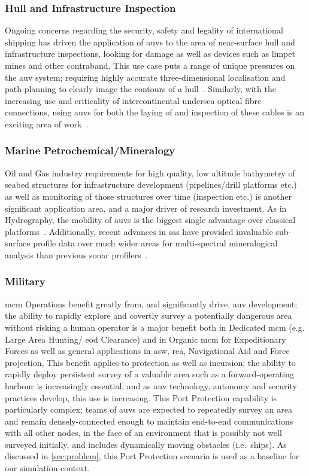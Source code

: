 \subsubsection{Hull and Infrastructure Inspection}
Ongoing concerns regarding the security, safety and legality of international shipping has driven the application of \glspl{auv} to the area of near-surface hull and infrastructure inspections, looking for damage as well as devices such as limpet mines and other contraband.
This use case puts a range of unique pressures on the \gls{auv} system; requiring highly accurate three-dimensional localisation and path-planning to clearly image the contours of a hull~\cite{Nicholson2008}.
Similarly, with the increasing use and criticality of intercontinental undersea optical fibre connections, using \glspl{auv} for both the laying of and inspection of these cables is an exciting area of work~\cite{Yu2004,Asakawa2002}.

\subsubsection{Marine Petrochemical/Mineralogy}
Oil and Gas industry requirements for high quality, low altitude bathymetry of seabed structures for infrastructure development (pipelines/drill platforms etc.) as well as monitoring of those structures over time (inspection etc.) is another significant application area, and a major driver of research investment.
As in Hydrography, the mobility of \glspl{auv} is the biggest single advantage over classical platforms~\cite{Morr2003}.
Additionally, recent advances in \gls{sas} have provided invaluable sub-surface profile data over much wider areas for multi-spectral mineralogical analysis than previous sonar profilers~\cite{Denny2015}.

\subsubsection{Military}\label{sec:military}
\gls{mcm} Operations benefit greatly from, and significantly drive, \gls{auv} development; the ability to rapidly explore and covertly survey a potentially dangerous area without risking a human operator is a major benefit both in Dedicated \gls{mcm} (e.g. Large Area Hunting/ \gls{eod} Clearance) and in Organic \gls{mcm} for Expeditionary Forces as well as general applications in  \gls{asw}, \gls{rea}, Navigational Aid and Force projection,
This benefit applies to protection as well as incursion; the ability to rapidly deploy persistent survey of a valuable area such as a forward-operating harbour is increasingly essential, and as \gls{auv} technology, autonomy and security practices develop, this use is increasing.
This Port Protection capability is particularly complex;  teams of \glspl{auv} are expected to repeatedly survey an area and remain densely-connected enough to maintain end-to-end communications with all other nodes, in the face of an environment that is possibly not well surveyed initially, and includes dynamically moving obstacles (i.e.\ ships).
As discussed in \autoref{sec:problem}, this Port Protection scenario is used as a baseline for our simulation context.


